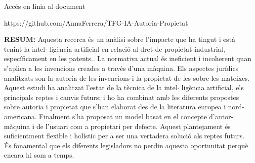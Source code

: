 \documentclass[12pt]{article}
\begin{document}
\vspace{\baselineskip}

\vspace{\baselineskip}

\vspace{\baselineskip}

\vspace{\baselineskip}

\vspace{\baselineskip}

\vspace{\baselineskip}

\vspace{\baselineskip}
\begin{Center}
{\fontsize{10pt}{12.0pt}\selectfont Accés en linia al document\par}
\end{Center}\par

\begin{Center}
https://github.com/AnnaFerrera/TFG-IA-Autoria-Propietat
\end{Center}\par


\vspace{\baselineskip}

\vspace{\baselineskip}

\vspace{\baselineskip}

\vspace{\baselineskip}

\vspace{\baselineskip}
\begin{justify}
\textbf{RESUM: }Aquesta recerca és un anàlisi sobre l’impacte que ha tingut i està tenint la intel$ \cdot $ ligència artificial en relació al dret de propietat industrial, específicament en les patents.. La normativa actual és ineficient i incoherent quan s’aplica a les invencions creades a través d’una màquina. Els aspectes jurídics analitzats son la autoria de les invencions i la propietat de les sobre les mateixes. Aquest estudi ha analitzat l’estat de la tècnica de la intel$ \cdot $ ligència artificial, els principals reptes i canvis futurs; i ho ha combinat amb les diferents propostes sobre autoria i propietat que s’han elaborat des de la literatura europea i nord-americana. Finalment s’ha proposat un model basat en el concepte d’autor-màquina i de l’usuari com a propietari per defecte. Aquest plantejament és suficientment flexible i holístic per a ser una vertadera solució als reptes futurs. És fonamental que els diferents legisladors no perdin aquesta oportunitat perquè encara hi som a temps. 
\end{justify}\par
\end{document}
